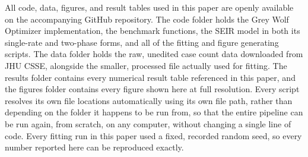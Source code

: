 \documentclass[journal]{IEEEtran}
\begin{document}
All code, data, figures, and result tables used in this paper are openly available on the accompanying GitHub repository. The code folder holds the Grey Wolf Optimizer implementation, the benchmark functions, the SEIR model in both its single-rate and two-phase forms, and all of the fitting and figure generating scripts. The data folder holds the raw, unedited case count data downloaded from JHU CSSE, alongside the smaller, processed file actually used for fitting. The results folder contains every numerical result table referenced in this paper, and the figures folder contains every figure shown here at full resolution. Every script resolves its own file locations automatically using its own file path, rather than depending on the folder it happens to be run from, so that the entire pipeline can be run again, from scratch, on any computer, without changing a single line of code. Every fitting run in this paper used a fixed, recorded random
seed, so every number reported here can be reproduced exactly.
\fi
\end{document}
